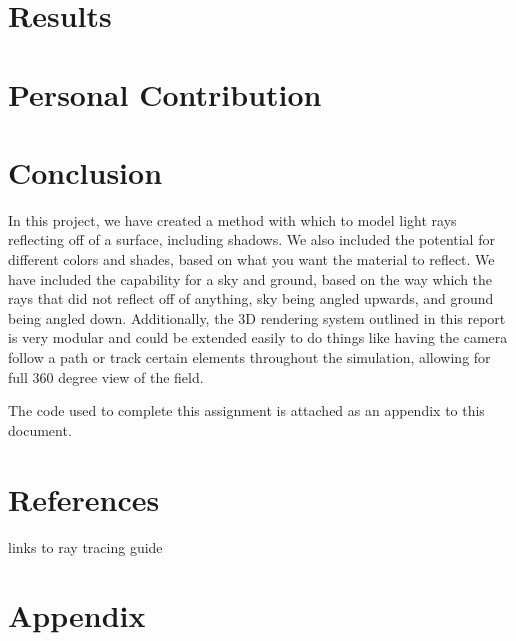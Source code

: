 \documentclass{article}
\begin{document}
\section{Results}

\section{Personal Contribution}

\section{Conclusion}
In this project, we have created a method with which to model light rays reflecting off of a surface, including shadows. We also
included the potential for different colors and shades, based on what you want the material to reflect. We have included the capability
for a sky and ground, based on the way which the rays that did not reflect off of anything, sky being angled upwards, and ground
being angled down. Additionally, the 3D rendering system outlined in this report is very modular and could be extended easily to
do things like having the camera follow a path or track certain elements throughout the simulation, allowing for full 360 degree
view of the field.

The code used to complete this assignment is attached as an appendix to this document.

\section{References}
links to ray tracing guide


\newpage
\onecolumn
\section{Appendix}



\end{document}
